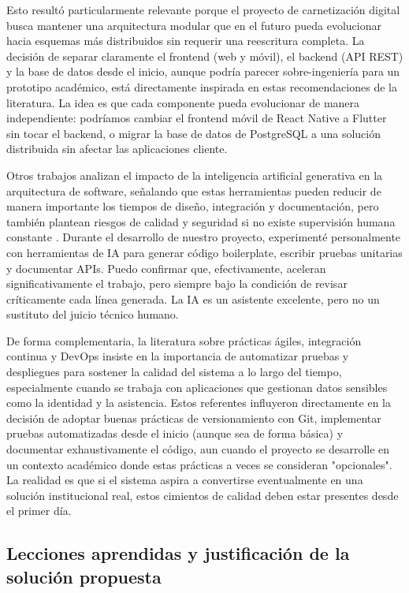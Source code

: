 Esto resultó particularmente relevante porque el proyecto de carnetización digital busca mantener una arquitectura modular que en el futuro pueda evolucionar hacia esquemas más distribuidos sin requerir una reescritura completa. La decisión de separar claramente el frontend (web y móvil), el backend (API REST) y la base de datos desde el inicio, aunque podría parecer sobre-ingeniería para un prototipo académico, está directamente inspirada en estas recomendaciones de la literatura. La idea es que cada componente pueda evolucionar de manera independiente: podríamos cambiar el frontend móvil de React Native a Flutter sin tocar el backend, o migrar la base de datos de PostgreSQL a una solución distribuida sin afectar las aplicaciones cliente.

Otros trabajos analizan el impacto de la inteligencia artificial generativa en la arquitectura de software, señalando que estas herramientas pueden reducir de manera importante los tiempos de diseño, integración y documentación, pero también plantean riesgos de calidad y seguridad si no existe supervisión humana constante \cite{kumar_genai_architecture}. Durante el desarrollo de nuestro proyecto, experimenté personalmente con herramientas de IA para generar código boilerplate, escribir pruebas unitarias y documentar APIs. Puedo confirmar que, efectivamente, aceleran significativamente el trabajo, pero siempre bajo la condición de revisar críticamente cada línea generada. La IA es un asistente excelente, pero no un sustituto del juicio técnico humano.

De forma complementaria, la literatura sobre prácticas ágiles, integración continua y DevOps insiste en la importancia de automatizar pruebas y despliegues para sostener la calidad del sistema a lo largo del tiempo, especialmente cuando se trabaja con aplicaciones que gestionan datos sensibles como la identidad y la asistencia. Estos referentes influyeron directamente en la decisión de adoptar buenas prácticas de versionamiento con Git, implementar pruebas automatizadas desde el inicio (aunque sea de forma básica) y documentar exhaustivamente el código, aun cuando el proyecto se desarrolle en un contexto académico donde estas prácticas a veces se consideran "opcionales". La realidad es que si el sistema aspira a convertirse eventualmente en una solución institucional real, estos cimientos de calidad deben estar presentes desde el primer día.

\subsection{Lecciones aprendidas y justificación de la solución propuesta}

